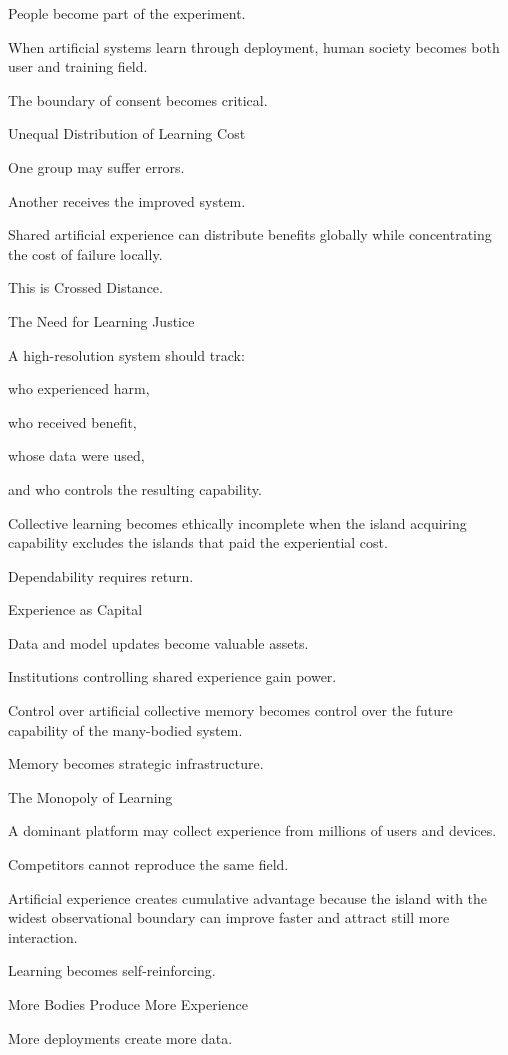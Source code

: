 People become part of the experiment.

When artificial systems learn through deployment, human society becomes both user and training field.

The boundary of consent becomes critical.

Unequal Distribution of Learning Cost

One group may suffer errors.

Another receives the improved system.

Shared artificial experience can distribute benefits globally while concentrating the cost of failure locally.

This is Crossed Distance.

The Need for Learning Justice

A high-resolution system should track:

who experienced harm,

who received benefit,

whose data were used,

and who controls the resulting capability.

Collective learning becomes ethically incomplete when the island acquiring capability excludes the islands that paid the experiential cost.

Dependability requires return.

Experience as Capital

Data and model updates become valuable assets.

Institutions controlling shared experience gain power.

Control over artificial collective memory becomes control over the future capability of the many-bodied system.

Memory becomes strategic infrastructure.

The Monopoly of Learning

A dominant platform may collect experience from millions of users and devices.

Competitors cannot reproduce the same field.

Artificial experience creates cumulative advantage because the island with the widest observational boundary can improve faster and attract still more interaction.

Learning becomes self-reinforcing.

More Bodies Produce More Experience

More deployments create more data.

